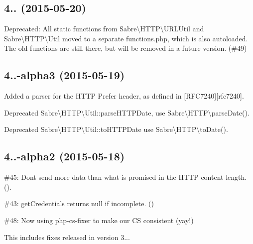 \subsection*{4.. (2015-\/05-\/20) }


\begin{DoxyItemize}
\item Deprecated\+: All static functions from {\ttfamily Sabre\textbackslash{}H\+T\+TP\textbackslash{}U\+R\+L\+Util} and {\ttfamily Sabre\textbackslash{}H\+T\+TP\textbackslash{}Util} moved to a separate {\ttfamily functions.\+php}, which is also autoloaded. The old functions are still there, but will be removed in a future version. (\#49)
\end{DoxyItemize}

\subsection*{4..-\/alpha3 (2015-\/05-\/19) }


\begin{DoxyItemize}
\item Added a parser for the H\+T\+TP {\ttfamily Prefer} header, as defined in \mbox{[}R\+F\+C7240\mbox{]}\mbox{[}rfc7240\mbox{]}.
\item Deprecated {\ttfamily Sabre\textbackslash{}H\+T\+TP\textbackslash{}Util\+::parse\+H\+T\+T\+P\+Date}, use {\ttfamily Sabre\textbackslash{}H\+T\+TP\textbackslash{}parse\+Date()}.
\item Deprecated {\ttfamily Sabre\textbackslash{}H\+T\+TP\textbackslash{}Util\+::to\+H\+T\+T\+P\+Date} use {\ttfamily Sabre\textbackslash{}H\+T\+TP\textbackslash{}to\+Date()}.
\end{DoxyItemize}

\subsection*{4..-\/alpha2 (2015-\/05-\/18) }


\begin{DoxyItemize}
\item \#45\+: Don\textquotesingle{}t send more data than what is promised in the H\+T\+TP content-\/length. ().
\item \#43\+: {\ttfamily get\+Credentials} returns null if incomplete. ()
\item \#48\+: Now using php-\/cs-\/fixer to make our CS consistent (yay!)
\item This includes fixes released in version 3...
\end{DoxyItemize}

